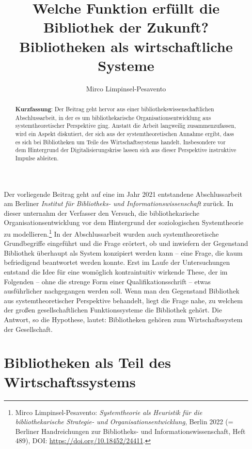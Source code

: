 \documentclass[a4paper,
fontsize=11pt,
oneside,
numbers=noperiodatend,
parskip=half-,
bibliography=totoc,
final
]{scrartcl}
\title{\LARGE{Welche Funktion erfüllt die Bibliothek der Zukunft? Bibliotheken als wirtschaftliche Systeme}}%
\author{Mirco Limpinsel-Pesavento} %
\date{}
\begin{document}
\maketitle
\thispagestyle{fancyplain} 

\begin{abstract}
\noindent
\textbf{Kurzfassung}: Der Beitrag geht hervor aus einer
bibliothekswissenschaftlichen Abschlussarbeit, in der es um
bibliothekarische Organisationsentwicklung aus system\-theoretischer
Perspektive ging. Anstatt die Arbeit langweilig zusammenzufassen, wird
ein Aspekt diskutiert, der sich aus der systemtheoretischen Annahme
ergibt, dass es sich bei Bibliotheken um Teile des Wirtschaftssystems
handelt. Insbesondere vor dem Hintergrund der Digitalisierungskrise
lassen sich aus dieser Perspektive instruktive Impulse ableiten.
\end{abstract}

Der vorliegende Beitrag geht auf eine im Jahr 2021 entstandene
Abschlussarbeit am Berliner \emph{Institut für Bibliotheks- und
Informationswissenschaft} zurück. In dieser unternahm der Verfasser den
Versuch, die bibliothekarische Organisationsentwicklung vor dem
Hintergrund der soziologischen Systemtheorie zu modellieren.\footnote{Mirco
  Limpinsel-Pesavento: \emph{Systemtheorie als Heuristik für die
  bibliothekarische Strategie- und Organisationsentwicklung}, Berlin
  2022 (= Berliner Handreichungen zur Bibliotheks- und
  Informationswissenschaft, Heft 489), DOI:
  \url{https://doi.org/10.18452/24411}.} In der Abschlussarbeit wurden
auch systemtheoretische Grundbegriffe eingeführt und die Frage erörtert,
ob und inwiefern der Gegenstand Bibliothek überhaupt als System
konzipiert werden kann -- eine Frage, die kaum befriedigend beantwortet
werden konnte. Erst im Laufe der Untersuchungen entstand die Idee für
eine womöglich kontraintuitiv wirkende These, der im Folgenden -- ohne
die strenge Form einer Qualifikationsschrift -- etwas ausführlicher
nachgegangen werden soll. Wenn man den Gegenstand Bibliothek aus
systemtheoretischer Perspektive behandelt, liegt die Frage nahe, zu
welchem der großen gesellschaftlichen Funktionssysteme die Bibliothek
gehört. Die Antwort, so die Hypothese, lautet: Bibliotheken gehören zum
Wirtschaftssystem der Gesellschaft.

\hypertarget{bibliotheken-als-teil-des-wirtschaftssystems}{%
\section{Bibliotheken als Teil des
Wirtschaftssystems}\label{bibliotheken-als-teil-des-wirtschaftssystems}}
\end{document}
